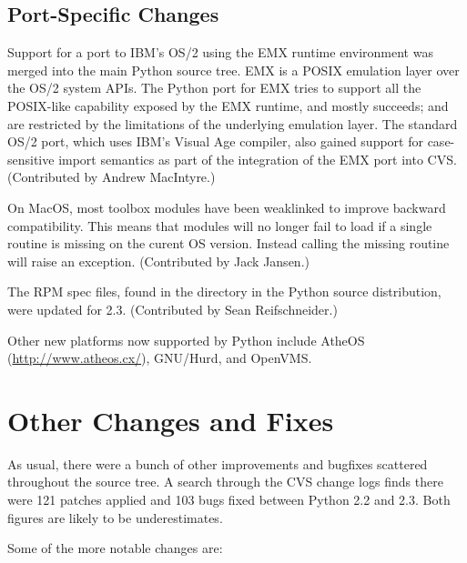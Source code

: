 \documentclass{howto}
\begin{document}
\subsection{Port-Specific Changes}

Support for a port to IBM's OS/2 using the EMX runtime environment was
merged into the main Python source tree.  EMX is a POSIX emulation
layer over the OS/2 system APIs.  The Python port for EMX tries to
support all the POSIX-like capability exposed by the EMX runtime, and
mostly succeeds;  and  are
restricted by the limitations of the underlying emulation layer.  The
standard OS/2 port, which uses IBM's Visual Age compiler, also gained
support for case-sensitive import semantics as part of the integration
of the EMX port into CVS.  (Contributed by Andrew MacIntyre.)

On MacOS, most toolbox modules have been weaklinked to improve
backward compatibility.  This means that modules will no longer fail
to load if a single routine is missing on the curent OS version.
Instead calling the missing routine will raise an exception.
(Contributed by Jack Jansen.)

The RPM spec files, found in the  directory in the
Python source distribution, were updated for 2.3.  (Contributed by
Sean Reifschneider.)

Other new platforms now supported by Python include AtheOS
(\url{http://www.atheos.cx/}), GNU/Hurd, and OpenVMS.


\section{Other Changes and Fixes \label{section-other}}

As usual, there were a bunch of other improvements and bugfixes
scattered throughout the source tree.  A search through the CVS change
logs finds there were 121 patches applied and 103 bugs fixed between
Python 2.2 and 2.3.  Both figures are likely to be underestimates.

Some of the more notable changes are:
\end{document}
